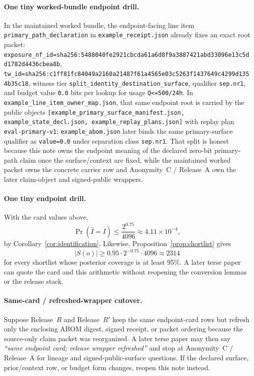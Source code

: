 \documentclass[11pt]{article}
\theoremstyle{definition}
\theoremstyle{remark}
\begin{document}
\paragraph{One tiny worked-bundle endpoint drill.}
In the maintained worked bundle, the endpoint-facing line item \texttt{primary\_path\_declaration} in \texttt{example\_receipt.json} already fixes an exact root packet: \texttt{exposure\_nf\_id=sha256:5488040fe2921cbcda61a6d8f9a3887421abd33096e13c5dd1782d4436cbea8b}, \texttt{tw\_id=sha256:c1ff81fc84049a2160a21487f61a4565e03c5263f1437649c4299d1354b35c18}, witness tier \texttt{split\_identity\_destination\_surface}, qualifier \texttt{sep.nr1}, and budget value \texttt{0.0} bits per lookup for usage \texttt{Q<=500/24h}. In \texttt{example\_line\_item\_owner\_map.json}, that same endpoint root is carried by the public objects \texttt{[example\_primary\_surface\_manifest.json, example\_state\_decl.json, example\_replay\_plans.json]} with replay plan \texttt{eval-primary-v1}; \texttt{example\_abom.json} later binds the same primary-surface qualifier as \texttt{value=0.0} under separation class \texttt{sep.nr1}. That split is honest because this note owns the endpoint meaning of the declared zero-bit primary-path claim once the surface/context are fixed, while the maintained worked packet owns the concrete carrier row and Anonymity~C / Release~A own the later claim-object and signed-public wrappers.\cite{series:workedexample,series:seriesspines,series:abomoinl,series:releaseA}

\paragraph{One tiny endpoint drill.}
With the card values above,
\[
\Pr(\widehat I = I) \le \frac{2^{0.75}}{4096} \approx 4.11\times 10^{-4},
\]
by Corollary~\ref{cor:identification}. Likewise, Proposition~\ref{prop:shortlist} gives
\[
|S(o)| \ge 0.95\cdot 2^{-0.75}\cdot 4096 \approx 2314
\]
for every shortlist whose posterior coverage is at least $95\%$. A later terse paper can quote the card and this arithmetic without reopening the conversion lemmas or the release stack.

\paragraph{Same-card / refreshed-wrapper cutover.}
Suppose Release~$R$ and Release~$R'$ keep the same endpoint-card rows but refresh only the enclosing ABOM digest, signed receipt, or packet ordering because the source-only claim packet was reorganized. A later terse paper may then say \emph{``same endpoint card; release wrapper refreshed''} and stop at Anonymity~C / Release~A for lineage and signed-public-surface questions. If the declared surface, prior/context row, or budget form changes, reopen this note instead.\cite{series:abomoinl,series:releaseA}
\end{document}
